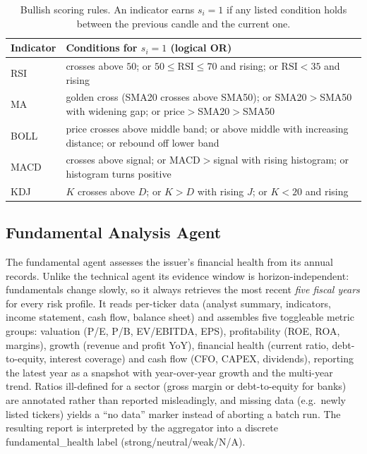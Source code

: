 \documentclass[runningheads]{llncs}
\begin{document}
\begin{table}[t]
\centering
\caption{Bullish scoring rules. An indicator earns $s_i=1$ if any listed
condition holds between the previous candle and the current one.}
\label{tab:scoring}
\begin{tabularx}{\textwidth}{@{}lX@{}}
\toprule
Indicator & Conditions for $s_i = 1$ (logical OR) \\
\midrule
RSI  & crosses above $50$; or $50\!\leq\!\mathrm{RSI}\!\leq\!70$ and rising; or $\mathrm{RSI}\!<\!35$ and rising \\
MA   & golden cross (SMA20 crosses above SMA50); or SMA20$>$SMA50 with widening gap; or price$>$SMA20$>$SMA50 \\
BOLL & price crosses above middle band; or above middle with increasing distance; or rebound off lower band \\
MACD & crosses above signal; or MACD$>$signal with rising histogram; or histogram turns positive \\
KDJ  & $K$ crosses above $D$; or $K>D$ with rising $J$; or $K<20$ and rising \\
\bottomrule
\end{tabularx}
\end{table}

\subsection{Fundamental Analysis Agent}
\label{sec:fundamental}

The fundamental agent assesses the issuer's financial health from its annual
records. Unlike the technical agent its evidence window is horizon-independent:
fundamentals change slowly, so it always retrieves the most recent \emph{five
fiscal years} for every risk profile. It reads per-ticker data (analyst summary,
indicators, income statement, cash flow, balance sheet) and assembles five
toggleable metric groups: valuation (P/E, P/B, EV/EBITDA, EPS), profitability
(ROE, ROA, margins), growth (revenue and profit YoY), financial health (current
ratio, debt-to-equity, interest coverage) and cash flow (CFO, CAPEX, dividends),
reporting the latest year as a snapshot with year-over-year growth and the
multi-year trend. Ratios ill-defined for a sector (gross margin or debt-to-equity
for banks) are annotated rather than reported misleadingly, and missing data
(e.g.\ newly listed tickers) yields a ``no data'' marker instead of aborting a
batch run. The resulting report is interpreted by the aggregator into a discrete
\textsf{fundamental\_health} label (strong/neutral/weak/N/A).
\end{document}
